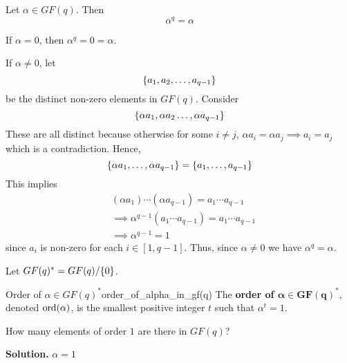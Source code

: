\begin{Theorem}{}{}
    Let $ \alpha\in GF(q) $. Then
    \[ \alpha^q=\alpha \]
\end{Theorem}

\begin{Proof}{}{}
    If $ \alpha=0 $, then $ \alpha^q=0=\alpha $.

    If $ \alpha\neq 0 $, let
    \[ \{a_1,a_2,\ldots ,a_{q-1}\} \]
    be the distinct non-zero elements in $ GF(q) $. Consider
    \[ \{\alpha a_1,\alpha a_2\ldots,\alpha a_{q-1}\} \]
    These are all distinct because otherwise for some $ i\neq j $,
    $ \alpha a_i=\alpha a_j\implies a_i=a_j $ which is a contradiction.
    Hence,
    \[ \{\alpha a_1,\ldots ,\alpha a_{q-1}\}=\{a_1,\ldots ,a_{q-1}\} \]
    This implies
    \begin{align*}
         & (\alpha a_1)\cdots (\alpha a_{q-1})=a_1\cdots a_{q-1}      \\
         & \implies \alpha^{q-1}(a_1\cdots a_{q-1})=a_1\cdots a_{q-1} \\
         & \implies \alpha^{q-1}=1
    \end{align*}
    since $ a_i $ is non-zero for each $ i\in[1,q-1] $.
    Thus, since $ \alpha\neq 0 $ we have $ \alpha^q=\alpha $.
\end{Proof}

\begin{Definition}{}{}
    Let $ GF(q)^*=GF(q)/\{0\} $.
\end{Definition}

\begin{Definition}{Order of $\alpha\in GF(q)^*$}{order_of_alpha_in_gf(q)}
    The \textbf{order of $\symbf{\alpha\in GF(q)^*}$}, denoted
    $ \operatorname{ord}(\alpha) $, is the smallest positive integer $ t $ such that
    $ \alpha^t=1 $.
\end{Definition}

\begin{Example}{}{}
    How many elements of order $ 1 $ are there in $ GF(q) $?

    \textbf{Solution.} $ \alpha=1 $
\end{Example}

